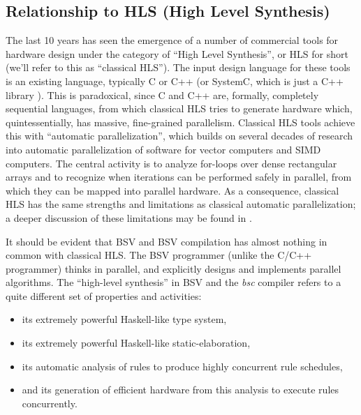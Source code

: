 \documentclass[11pt]{article}
\begin{document}

\subsection{Relationship to HLS (High Level Synthesis)}

The last 10 years has seen the emergence of a number of commercial
tools for hardware design under the category of ``High Level
Synthesis'', or HLS for short \cite{Coussy2009} (we'll refer to this
as ``classical HLS'').  The input design language for these tools is
an existing language, typically C or C++ (or SystemC, which is just
a C++ library \cite{IEEESystemC2011a}).  This is paradoxical, since C
and C++ are, formally, completely sequential languages, from which
classical HLS tries to generate hardware which, quintessentially, has
massive, fine-grained parallelism.  Classical HLS tools achieve this
with ``automatic parallelization'', which builds on several decades of
research into automatic parallelization of software for vector
computers and SIMD computers.  The central activity is to analyze
for-loops over dense rectangular arrays and to recognize when
iterations can be performed safely in parallel, from which they can be
mapped into parallel hardware.  As a consequence, classical HLS has
the same strengths and limitations as classical automatic
parallelization; a deeper discussion of these limitations may be found
in \cite{Edwards2005a}.

It should be evident that BSV and BSV compilation has almost nothing
in common with classical HLS.  The BSV programmer (unlike the C/C++
programmer) thinks in parallel, and explicitly designs and implements
parallel algorithms.  The ``high-level synthesis'' in BSV and the
\emph{bsc} compiler refers to a quite different set of properties and
activities:

\begin{itemize}

\item its extremely powerful Haskell-like type system,

\item its extremely powerful Haskell-like static-elaboration,

\item its automatic analysis of rules to produce highly concurrent rule schedules,

\item and its generation of efficient hardware from this analysis to
execute rules concurrently.

\end{itemize}
\end{document}
